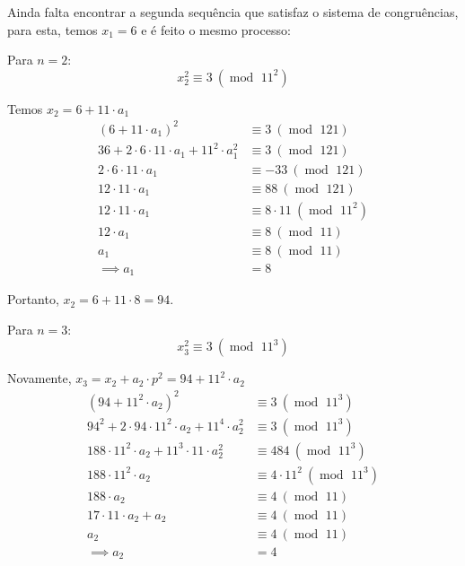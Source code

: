 \documentclass{report}
\DeclareMathOperator{\modulo}{mod \ }
\theoremstyle{definition}
\begin{document}
\bigskip

Ainda falta encontrar a segunda sequência que satisfaz o sistema de congruências, para esta, temos $x_1 = 6$ e é feito o mesmo processo:

\bigskip
        
Para $n = 2$:
\begin{equation*}
    x_2^2 \equiv 3 \ (\modulo 11^2)
\end{equation*}

Temos $x_2 = 6 + 11 \cdot a_1$
\begin{align*}
    (6 + 11 \cdot a_1)^2 &\equiv 3 \ (\modulo 121) \\
    36 + 2 \cdot 6 \cdot 11 \cdot a_1 + 11^2 \cdot a_1^2 &\equiv 3 \ (\modulo 121) \\
    2 \cdot 6 \cdot 11 \cdot a_1 &\equiv -33 \ (\modulo 121) \\
    12 \cdot 11 \cdot a_1 &\equiv 88 \ (\modulo 121) \\
    12 \cdot 11 \cdot a_1 &\equiv 8 \cdot 11 \ (\modulo 11^2) \\
    12 \cdot a_1 &\equiv 8 \ (\modulo 11) \\
    a_1 &\equiv 8 \ (\modulo 11) \\
    \implies a_1 &= 8
\end{align*}

Portanto, $x_2 = 6 + 11 \cdot 8 = 94$.

\bigskip
        
Para $n = 3$:
\begin{equation*}
    x_3^2 \equiv 3 \ (\modulo 11^3)
\end{equation*}

Novamente, $x_3 = x_2 + a_2 \cdot p^2 = 94 + 11^2 \cdot a_2$
\begin{align*}
    (94 + 11^2 \cdot a_2)^2 &\equiv 3 \ (\modulo 11^3) \\
    94^2 + 2 \cdot 94 \cdot 11^2 \cdot a_2 + 11^4 \cdot a_2^2 &\equiv 3 \ (\modulo 11^3) \\
    188 \cdot 11^2 \cdot a_2 + 11^3 \cdot 11 \cdot a_2^2 &\equiv 484 \ (\modulo 11^3) \\
    188 \cdot 11^2 \cdot a_2 &\equiv 4 \cdot 11^2 \ (\modulo 11^3) \\
    188 \cdot a_2 &\equiv 4 \ (\modulo 11) \\
    17 \cdot 11 \cdot a_2 + a_2 &\equiv 4 \ (\modulo 11) \\
    a_2 &\equiv 4 \ (\modulo 11) \\
    \implies a_2 &= 4
\end{align*}
\end{document}
